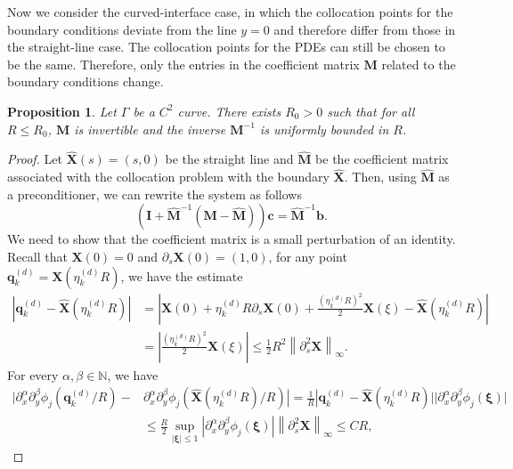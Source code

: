 \documentclass[preprint,11pt]{elsarticle}
\newtheorem{proposition}{Proposition}
\theoremstyle{remark}
\newcommand{\paren}[1]{\left(#1\right)}
\newcommand{\wh}[1]{\widehat{#1}}
\newcommand{\bm}[1]{\boldsymbol{#1}}
\newcommand{\norm}[1]{\left\lVert #1 \right\rVert}
\begin{document}
Now we consider the curved-interface case, in which the collocation points for the boundary conditions deviate from the line $y=0$ and therefore differ from those in the straight-line case. The collocation points for the PDEs can still be chosen to be the same. Therefore, only the entries in the coefficient matrix $\bm M$ related to the boundary conditions change.

\begin{proposition}
    Let $\Gamma$ be a $C^2$ curve. There exists $R_0 > 0$ such that for all $R \leq R_0$, $\bm M$ is invertible and the inverse $\bm M^{-1}$ is uniformly bounded in $R$.
\end{proposition}
\begin{proof}
Let $\wh{\bm X}(s) = (s,0)$ be the straight line and $\wh{\bm M}$ be the coefficient matrix associated with the collocation problem with the boundary $\wh{\bm X}$. 
Then, using $\wh {\bm M}$ as a preconditioner, we can rewrite the system as follows
\begin{equation}
    \paren{\bm I + \wh{\bm M}^{-1}(\bm M - \wh{\bm M})}\bm c = \wh{\bm M}^{-1}\bm b.
\end{equation}
We need to show that the coefficient matrix is a small perturbation of an identity.
Recall that $\bm X(0) = 0$ and $\partial_s\bm X(0) = (1,0)$, for any point $\bm q_k^{(d)} = \bm X(\eta_k^{(d)}R)$, we have the estimate
\begin{equation}
\begin{aligned}
    |\bm q_k^{(d)} - \wh{\bm X}(\eta_k^{(d)}R)| &= |\bm X(0) + \eta_k^{(d)}R\partial_s\bm X(0) + \frac{(\eta_k^{(d)}R)^2}{2}\bm X(\xi) -\wh{\bm X}(\eta_k^{(d)}R)| \\
    &= |\frac{(\eta_k^{(d)}R)^2}{2}\bm X(\xi)| \leq \frac{1}{2} R^2 \norm{\partial_s^2\bm X}_\infty.
\end{aligned}
\end{equation}
For every $\alpha, \beta \in \mathbb N$, we have
\begin{equation}
\begin{aligned}    
    |\partial_x^\alpha\partial_y^\beta \phi_j (\bm q_k^{(d)}/R) -& \partial_x^\alpha\partial_y^\beta \phi_j (\wh{\bm X}(\eta_k^{(d)}R)/R) | =\frac{1}{R} |\bm q_k^{(d)} - \wh{\bm X}(\eta_k^{(d)}R)||\partial_x^\alpha\partial_y^\beta \phi_j(\bm \xi)| \\
    &\leq \frac{R}{2} \sup_{|\bm \xi|\leq 1}|\partial_x^\alpha\partial_y^\beta \phi_j(\bm \xi)| \norm{\partial_s^2\bm X}_\infty \leq C R ,
\end{aligned}
\end{equation}

\end{proof}
\end{document}
